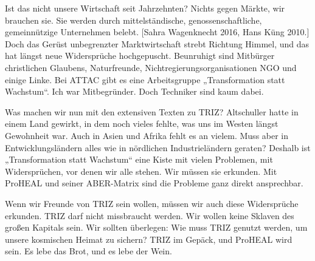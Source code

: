 \documentclass[12pt,a4paper]{article}
\begin{document}
Ist das nicht unsere Wirtschaft seit Jahrzehnten? Nichts gegen Märkte, wir
brauchen sie. Sie werden durch mittelständische, genossenschaftliche,
gemeinnützige Unternehmen belebt. [Sahra Wagenknecht 2016, Hans Küng 2010.]
Doch das Gerüst unbegrenzter Marktwirtschaft strebt Richtung Himmel, und das
hat längst neue Widersprüche hochgepuscht. Beunruhigt sind Mitbürger
christlichen Glaubens, Naturfreunde, Nichtregierungsorganisationen NGO und
einige Linke. Bei ATTAC gibt es eine Arbeitsgruppe „Transformation statt
Wachstum“. Ich war Mitbegründer. Doch Techniker sind kaum dabei.

Was machen wir nun mit den extensiven Texten zu TRIZ? Altschuller hatte in
einem Land gewirkt, in dem noch vieles fehlte, was uns im Westen längst
Gewohnheit war. Auch in Asien und Afrika fehlt es an vielem. Muss aber in
Entwicklungsländern alles wie in nördlichen Industrieländern geraten?
Deshalb ist „Transformation statt Wachstum“ eine Kiste mit vielen Problemen,
mit Widersprüchen, vor denen wir alle stehen. Wir müssen sie erkunden. Mit
ProHEAL und seiner ABER-Matrix sind die Probleme ganz direkt ansprechbar.

Wenn wir Freunde von TRIZ sein wollen, müssen wir auch diese Widersprüche
erkunden. TRIZ darf nicht missbraucht werden. Wir wollen keine Sklaven des
großen Kapitals sein. Wir sollten überlegen: Wie muss TRIZ genutzt werden, um
unsere kosmischen Heimat zu sichern? TRIZ im Gepäck, und ProHEAL wird sein.  Es
lebe das Brot, und es lebe der Wein.

\ccnotice
\end{document}
